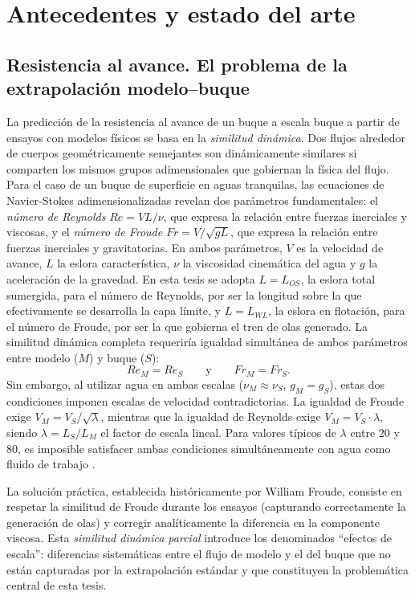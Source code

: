 \chapter{Antecedentes y estado del arte}
\label{chap:antecedentes}
\minitoc
 
 
\section{Resistencia al avance. El problema de la extrapolación modelo--buque}
\label{sec:extrapolacion}

La predicción de la resistencia al avance de un buque a escala buque a partir de ensayos con modelos físicos se basa en la \emph{similitud dinámica}. Dos flujos alrededor de cuerpos geométricamente semejantes son dinámicamente similares si comparten los mismos grupos adimensionales que gobiernan la física del flujo. Para el caso de un buque de superficie en aguas tranquilas, las ecuaciones de Navier-Stokes adimensionalizadas revelan dos parámetros fundamentales: el \emph{número de Reynolds} $Re = VL/\nu$, que expresa la relación entre fuerzas inerciales y viscosas, y el \emph{número de Froude} $Fr = V/\sqrt{gL}$, que expresa la relación entre fuerzas inerciales y gravitatorias. En ambos parámetros, $V$ es la velocidad de avance, $L$ la eslora característica, $\nu$ la viscosidad cinemática del agua y $g$ la aceleración de la gravedad. En esta tesis se adopta $L = L_{OS}$, la eslora total sumergida, para el número de Reynolds, por ser la longitud sobre la que efectivamente se desarrolla la capa límite, y $L = L_{WL}$, la eslora en flotación, para el número de Froude, por ser la que gobierna el tren de olas generado. La similitud dinámica completa requeriría igualdad simultánea de ambos parámetros entre modelo ($M$) y buque ($S$):
%
\begin{equation}
    Re_M = Re_S \qquad \text{y} \qquad Fr_M = Fr_S.
\end{equation}
%
Sin embargo, al utilizar agua en ambas escalas ($\nu_M \approx \nu_S$, $g_M = g_S$), estas dos condiciones imponen escalas de velocidad contradictorias. La igualdad de Froude exige $V_M = V_S / \sqrt{\lambda}$, mientras que la igualdad de Reynolds exige $V_M = V_S \cdot \lambda$, siendo $\lambda = L_S / L_M$ el factor de escala lineal. Para valores típicos de $\lambda$ entre 20 y 80, es imposible satisfacer ambas condiciones simultáneamente con agua como fluido de trabajo \citep{birk2019}.

La solución práctica, establecida históricamente por William Froude, consiste en respetar la similitud de Froude durante los ensayos (capturando correctamente la generación de olas) y corregir analíticamente la diferencia en la componente viscosa. Esta \emph{similitud dinámica parcial} introduce los denominados ``efectos de escala'': diferencias sistemáticas entre el flujo de modelo y el del buque que no están capturadas por la extrapolación estándar y que constituyen la problemática central de esta tesis.

